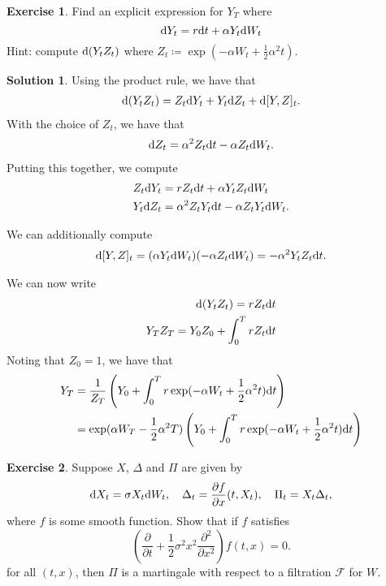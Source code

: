 \documentclass[12pt]{article}
\newcommand{\calF}{\mathcal{F}}
\theoremstyle{definition}
\newtheorem{exer}{Exercise}
\newtheorem{sol}{Solution}
\theoremstyle{remark}
\def\d{{\rm d}}
\begin{document}
\newpage

\begin{exer}
Find an explicit expression for $Y_{T}$ where
\begin{equation*}
\d Y_{t} = r \d t + \alpha Y_{t} \d W_{t}
\end{equation*}
Hint: compute $\d (Y_t Z_t)$ where $Z_t \coloneqq \exp(- \alpha W_t + \frac{1}{2} \alpha^2 t)$.
\end{exer}

\begin{sol}
Using the product rule, we have that
\begin{align*}
    \d (Y_{t} Z_{t}) = Z_{t} \d Y_{t} + Y_{t} \d Z_{t} + \d [Y, Z]_{t}.
\end{align*}
With the choice of $Z_{t}$, we have that
\begin{align*}
\d Z_{t} =\alpha^{2} Z_{t} \d t - \alpha Z_{t} \d W_{t}.
\end{align*}
Putting this together, we compute
\begin{align*}
    Z_{t} \d Y_{t} &= r Z_{t} \d t + \alpha Y_{t} Z_{t} \d W_{t}\\
    Y_{t} \d Z_{t} &= \alpha^{2} Z_{t} Y_{t} \d t - \alpha Z_{t} Y_{t} \d W_{t}.
\end{align*}

We can additionally compute
\begin{align*}
    \d[Y, Z]_{t} = (\alpha Y_{t} \d W_{t} )( - \alpha Z_{t} \d W_{t}) =  - \alpha^{2}  Y_{t} Z_{t} \d t.
\end{align*}

We can now write
\begin{align*}
    \d (Y_{t}Z_{t}) = r Z_{t} \d t\\
    Y_{T} Z_{T} = Y_{0} Z_{0} + \int_{0}^{T} r Z_{t} \d t
\end{align*}
Noting that $Z_{0} = 1$, we have that
\begin{align*}
    Y_{T} &= \frac{1}{Z_{T}} \left(Y_{0} + \int_{0}^{T} r \exp(- \alpha W_{t} + \frac{1}{2} \alpha^{2} t) \d t \right)\\
          &= \exp(\alpha W_{T} - \frac{1}{2} \alpha^{2}T)\left(Y_{0} + \int_{0}^{T} r \exp(- \alpha W_{t} + \frac{1}{2} \alpha^{2} t) \d t \right)
\end{align*}

\end{sol}
\newpage

\begin{exer}
Suppose $X$, $\Delta$ and $\Pi$ are given by
\begin{equation*}
    \d X_{t} = \sigma X_{t} \d W_{t}, \quad \Delta_{t} = \frac{\partial f}{\partial x}(t, X_{t}), \quad \Pi_{t} = X_{t} \Delta_{t},
\end{equation*}
where $f$ is some smooth function. Show that if $f$ satisfies 
\begin{equation*}
    \left( \frac{\partial }{\partial t} + \frac{1}{2} \sigma^{2} x^{2} \frac{\partial^{2} }{\partial x^{2}}   \right ) f(t, x) = 0.
\end{equation*}
for all $(t,x)$, then $\Pi$ is a martingale with respect to a filtration $\calF$ for $W$.
\end{exer}
\end{document}
